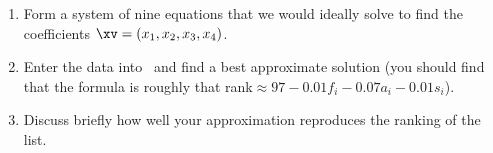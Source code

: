 \begin{exercise}
\begin{enumerate}
\item Form a system of nine equations that we would ideally solve to find the coefficients \(\xv=(x_1,x_2,x_3,x_4)\).
\setbox\ajrqrbox\hbox{}%
\marginajrbox%
\item Enter the data into \script\ and find a best approximate solution (you should find that the formula is roughly that rank\({}\approx 97-0.01f_i-0.07a_i-0.01s_i\)).
\item Discuss briefly how well your approximation reproduces the ranking of the list.
\end{enumerate}
\end{exercise}

